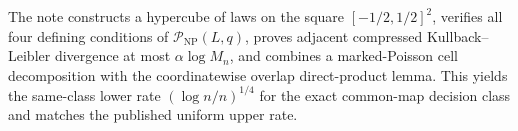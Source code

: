 The note constructs a hypercube of laws on the square \([-1/2,1/2]^2\), verifies all four defining conditions of \(\mathcal P_{\mathrm{NP}}(L,q)\), proves adjacent compressed Kullback--Leibler divergence at most \(\alpha\log M_n\), and combines a marked-Poisson cell decomposition with the coordinatewise overlap direct-product lemma.  This yields the same-class lower rate \((\log n/n)^{1/4}\) for the exact common-map decision class and matches the published uniform upper rate.
